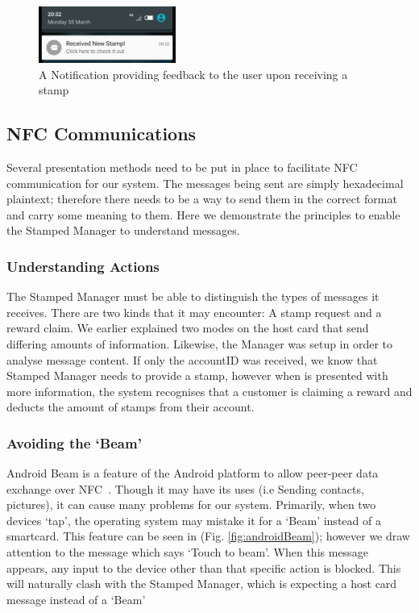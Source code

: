 \begin{figure}[H]
 \centering
  \includegraphics[width=0.40\textwidth]{img/notification.jpg}
     \caption{A Notification providing feedback to the user upon receiving a stamp}
     \label{fig:notification}
\end{figure}

\subsection{NFC Communications}
Several presentation methods need to be put in place to facilitate NFC communication for our system. The messages being sent are simply hexadecimal plaintext; therefore there needs to be a way to send them in the correct format and carry some meaning to them. Here we demonstrate the principles to enable the Stamped Manager to understand messages.

\subsubsection{Understanding Actions}
\label{sec:understanding}
The Stamped Manager must be able to distinguish the types of messages it receives. There are two kinds that it may encounter: A stamp request and a reward claim. We earlier explained two modes on the host card that send differing amounts of information. Likewise, the Manager was setup in order to analyse message content. If only the accountID was received, we know that Stamped Manager needs to provide a stamp, however when is presented with more information, the system recognises that a customer is claiming a reward and deducts the amount of stamps from their account.

\subsubsection{Avoiding the `Beam'}
Android Beam is a feature of the Android platform to allow peer-peer data exchange over NFC~\cite{androidBeam}. Though it may have its uses (i.e Sending contacts, pictures), it can cause many problems for our system. Primarily, when two devices `tap', the operating system may mistake it for a `Beam' instead of a smartcard. This feature can be seen in (Fig. \ref{fig:androidBeam}); however we draw attention to the message which says `Touch to beam'. When this message appears, any input to the device other than that specific action is blocked. This will naturally clash with the Stamped Manager, which is expecting a host card message instead of a `Beam'

